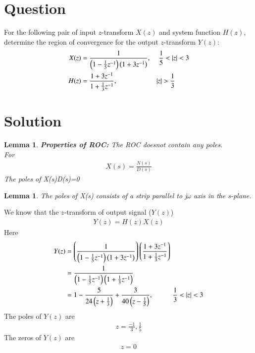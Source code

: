 \documentclass[journal,12pt,twocolumn]{IEEEtran}
\newtheorem{lemma}[theorem]{Lemma}
\begin{document}
\section{Question}
For the following pair of input $z$-transform $X(z)$ and system function $H(z)$, determine the region of convergence for the output $z$-transform $Y(z)$:
\begin{align}
    X(z)&=\frac{1}{\brak{1-\frac{1}{5}{z^{-1}}}\brak{1+3z^{-1}}},\hspace{0.4cm}  \frac{1}{5}<|z|<3\\
    H(z)&=\frac{1+3z^{-1}}{1+\frac{1}{3}z^{-1}}, \hspace{2cm} |z|>\frac{1}{3}
\end{align}
\section{Solution}
\begin{lemma}{\textbf{Properties of ROC:}}
The ROC doesnot contain any poles.\\
For
\begin{align}
    X(s)=\frac{N(s)}{D(s)}
\end{align}
The poles of X(s)\implies D(s)=0
\end{lemma}
\begin{lemma}
 The poles of X(s) consists of a strip parallel to j$\omega$ axis in the s-plane.
\end{lemma}
We know that the $z$-transform of output signal ($Y(z)$)
\begin{align}
    Y(z)=H(z)X(z)
\end{align}
Here
\begin{align}
    Y(z)&=\brak{\frac{1}{\brak{1-\frac{1}{5}{z^{-1}}}\brak{1+3z^{-1}}}} \brak{\frac{1+3z^{-1}}{1+\frac{1}{3}z^{-1}}}\\
        &= \frac{1}{\brak{1-\frac{1}{5}{z^{-1}}}\brak{1+\frac{1}{3}z^{-1}}} \label{eq1}\\
        &= 1 - \frac{5}{24\brak{z+\frac{1}{3}}}+\frac{3}{40\brak{z-\frac{1}{5}}}, \hspace{1cm} \frac{1}{3}<|z|<3
\end{align}
The poles of $Y(z)$ are 
\begin{align}
    z=\frac{-1}{3}, \frac{1}{5}
\end{align}
The zeros of $Y(z)$ are 
\begin{align}
    z=0
\end{align}
\end{document}
